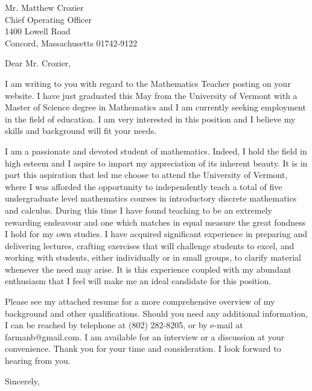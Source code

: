 \documentclass{letter}
\begin{document}
\begin{letter}{Mr. Matthew Crozier\\
Chief Operating Officer\\
1400 Lowell Road\\
Concord, Massachusetts 01742-9122}

  \opening{Dear Mr. Crozier,}

  I am writing to you with regard to the Mathematics Teacher posting on your website.  
  I have just graduated this May from the University of Vermont with a Master of Science degree in Mathematics and I am currently seeking employment in the field of education.  
  I am very interested in this position and I believe my skills and background will fit your needs.

  I am a passionate and devoted student of mathematics.  
  Indeed, I hold the field in high esteem and I aspire to impart my appreciation of its inherent beauty.  
  It is in part this aspiration that led me choose to attend the University of Vermont, where I was afforded the opportunity to independently teach a total of five undergraduate level mathematics courses in introductory discrete mathematics and calculus.  
  During this time I have found teaching to be an extremely rewarding endeavour and one which matches in equal measure the great fondness I hold for my own studies.  
  I have acquired significant experience in preparing and delivering lectures, crafting exercises that will challenge students to excel, and working with students, either individually or in small groups, to clarify material whenever the need may arise.  
  It is this experience coupled with my abundant enthusiasm that I feel will make me an ideal candidate for this position.

  Please see my attached resume for a more comprehensive overview of my background and other qualifications.  
  Should you need any additional information, I can be reached by telephone at (802) 282-8205, or by e-mail at farmanb@gmail.com.  
  I am available for an interview or a discussion at your convenience.  
  Thank you for your time and consideration.  
  I look forward to hearing from you.

  \closing{Sincerely,}
\end{letter}
\end{document}
